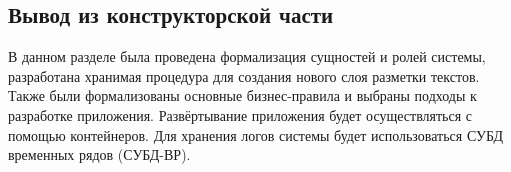 %
%
%
%
%
%
%
%
%



\subsection*{Вывод из конструкторской части}

В данном разделе была проведена формализация сущностей и ролей системы, разработана хранимая процедура для создания нового слоя разметки текстов. Также были формализованы основные бизнес-правила и выбраны подходы к разработке приложения. Развёртывание приложения будет осуществляться с помощью контейнеров. Для хранения логов системы будет использоваться СУБД временных рядов (СУБД-ВР).



\pagebreak